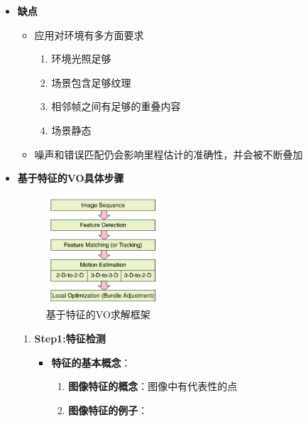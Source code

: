 \documentclass[../main.tex]{subfiles}
\begin{document}
\begin{enumerate}
\begin{itemize}
\begin{itemize}
                \end{itemize}
            \item \textbf{缺点}
                \begin{itemize}
                    \item 应用对环境有多方面要求
                        \begin{enumerate}
                            \item 环境光照足够
                            \item 场景包含足够纹理
                            \item 相邻帧之间有足够的重叠内容
                            \item 场景静态
                        \end{enumerate}
                    \item 噪声和错误匹配仍会影响里程估计的准确性，并会被不断叠加
                \end{itemize}            
            \item \textbf{基于特征的VO具体步骤}
                    \begin{figure}[H]
                        \centering
                        \includegraphics[width=0.4\textwidth]{images/vo_structure.png}
                        \caption{基于特征的VO求解框架}
                    \end{figure}
                \begin{enumerate}
                    \item \textbf{Step1:特征检测}
                        \begin{itemize}
                            \item \textbf{特征的基本概念}：
                                \begin{enumerate}
                                    \item \textbf{图像特征的概念}：图像中有代表性的点
                                    \item \textbf{图像特征的例子}：

\end{enumerate}
\end{itemize}
\end{enumerate}
\end{itemize}
\end{enumerate}
\end{document}
